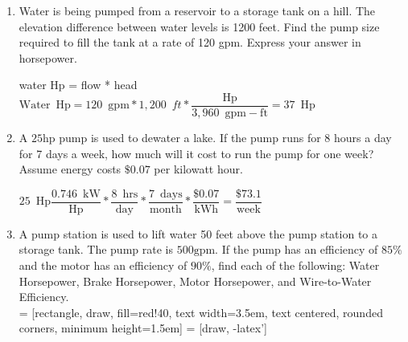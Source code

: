 \documentclass{article}
\begin{document}
\begin{enumerate}
  \item Water is being pumped from a reservoir to a storage tank on a hill. The elevation difference between water levels is 1200 feet. Find the pump size required to fill the tank at a rate of 120 gpm. Express your answer in horsepower.
  
  \vspace{0.4cm}
water Hp = flow * head\\
\vspace{0.4cm}
$\mathrm{Water} \enspace \mathrm{Hp} = 120 \enspace \mathrm{gpm}*1,200 \enspace ft*\dfrac{\mathrm{Hp}}{3,960 \enspace \mathrm{gpm-ft}}=\boxed{ 37 \enspace \mathrm{Hp}}$\\
\vspace{0.2cm}


  \item A $25 \mathrm{hp}$ pump is used to dewater a lake. If the pump runs for 8 hours a day for 7 days a week, how much will it cost to run the pump for one week? Assume energy costs $\$ 0.07$ per kilowatt hour.
  
  \vspace{0.4cm}
$25 \enspace \mathrm{Hp}\dfrac{0.746 \enspace \mathrm{kW}}{\mathrm{Hp}}*\dfrac{8 \enspace \mathrm{hrs}}{\mathrm{day}}*\dfrac{7 \enspace \mathrm{days}}{\mathrm{month}}*\dfrac{\$0.07}{\mathrm{kWh}}=\boxed{\dfrac{\$73.1}{\mathrm{week}}}$\\
\vspace{0.2cm}

\newpage

  \item A pump station is used to lift water 50 feet above the pump station to a storage tank. The pump rate is $500 \mathrm{gpm}$. If the pump has an efficiency of $85 \%$ and the motor has an efficiency of $90 \%$, find each of the following: Water Horsepower, Brake Horsepower, Motor Horsepower, and Wire-to-Water Efficiency.\\

 = [rectangle, draw, fill=red!40, 
    text width=3.5em, text centered, rounded corners, minimum height=1.5em]
 = [draw, -latex']
\begin{figure}[h!]
\centering
{}
\end{figure}
\end{enumerate}
\end{document}
